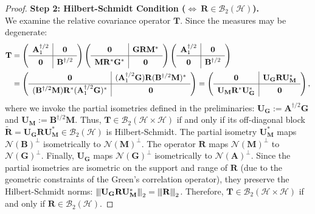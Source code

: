 \documentclass[noinfoline]{imsart}\setcounter{tocdepth}{2}
\newcommand{\m}[1]{\mathbf{#1}}
\renewcommand{\c}[1]{\mathcal{#1}}
\newcommand{\vertiii}[1]{{\left\vert\kern-0.25ex\left\vert\kern-0.25ex\left\vert #1 
    \right\vert\kern-0.25ex\right\vert\kern-0.25ex\right\vert}} %
\theoremstyle{plain}
\begin{document}
\begin{proof}
\noindent \textbf{Step 2: Hilbert-Schmidt Condition ($\Longleftrightarrow \ \m{R} \in \c{B}_{2}(\c{H})$).} \\
We examine the relative covariance operator $\m{T}$. Since the measures may be degenerate:
\begin{align*}
    \renewcommand{\arraystretch}{1.3}
    \m{T} &= 
    \left(
    \begin{array}{c|c}
    \m{A}_1^{\dagger/2} & \m{0} \\
    \hline
    \m{0} & \m{B}^{\dagger/2}
    \end{array}
    \right)
    \left(
    \begin{array}{c|c}
    \m{0} & \m{G} \m{R} \m{M}^* \\
    \hline
    \m{M} \m{R}^* \m{G}^* & \m{0}
    \end{array}
    \right)
    \left(
    \begin{array}{c|c}
    \m{A}_1^{\dagger/2} & \m{0} \\
    \hline
    \m{0} & \m{B}^{\dagger/2}
    \end{array}
    \right) \\
    &= 
    \left(
    \begin{array}{c|c}
    \m{0} & (\m{A}_1^{\dagger/2} \m{G}) \m{R} (\m{B}^{\dagger/2} \m{M})^* \\
    \hline
    (\m{B}^{\dagger/2} \m{M}) \m{R}^* (\m{A}_1^{\dagger/2} \m{G})^{*} & \m{0}
    \end{array}
    \right)
    = 
    \left(
    \begin{array}{c|c}
    \m{0} & \m{U}_{\m{G}} \m{R} \m{U}_{\m{M}}^* \\
    \hline
    \m{U}_{\m{M}} \m{R}^* \m{U}_{\m{G}}^* & \m{0}
    \end{array}
    \right),
\end{align*}
where we invoke the partial isometries defined in the preliminaries: $\m{U}_{\m{G}} := \m{A}^{\dagger/2} \m{G}$ and $\m{U}_{\m{M}}:=\m{B}^{\dagger/2} \m{M}$. Thus, $\m{T} \in \c{B}_2(\c{H} \times \c{H})$ if and only if its off-diagonal block $\tilde{\m{R}} = \m{U}_{\m{G}} \m{R} \m{U}_{\m{M}}^* \in \c{B}_{2}(\c{H})$ is Hilbert-Schmidt.
The partial isometry $\m{U}_{\m{M}}^*$ maps $\c{N}(\m{B})^\perp$ isometrically to $\c{N}(\m{M})^\perp$. The operator $\m{R}$ maps $\c{N}(\m{M})^\perp$ to $\c{N}(\m{G})^\perp$. Finally, $\m{U}_{\m{G}}$ maps $\c{N}(\m{G})^\perp$ isometrically to $\c{N}(\m{A})^\perp$.
Since the partial isometries are isometric on the support and range of $\m{R}$ (due to the geometric constraints of the Green's correlation operator), they preserve the Hilbert-Schmidt norms: $\vertiii{\m{U}_{\m{G}} \m{R} \m{U}_{\m{M}}^*}_{2} = \vertiii{\m{R}}_{2}$.
Therefore, $\m{T} \in \c{B}_2(\c{H} \times \c{H})$ if and only if $\m{R} \in \c{B}_2(\c{H})$.
\end{proof}
\end{document}
